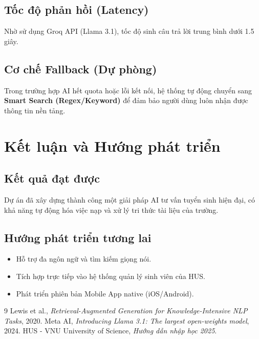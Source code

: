 \documentclass[12pt,a4paper]{report}
\begin{document}
\section{Tốc độ phản hồi (Latency)}
Nhờ sử dụng Groq API (Llama 3.1), tốc độ sinh câu trả lời trung bình dưới 1.5 giây.

\section{Cơ chế Fallback (Dự phòng)}
Trong trường hợp AI hết quota hoặc lỗi kết nối, hệ thống tự động chuyển sang \textbf{Smart Search (Regex/Keyword)} để đảm bảo người dùng luôn nhận được thông tin nền tảng.

\chapter{Kết luận và Hướng phát triển}
\section{Kết quả đạt được}
Dự án đã xây dựng thành công một giải pháp AI tư vấn tuyển sinh hiện đại, có khả năng tự động hóa việc nạp và xử lý tri thức tài liệu của trường.

\section{Hướng phát triển tương lai}
\begin{itemize}
    \item Hỗ trợ đa ngôn ngữ và tìm kiếm giọng nói.
    \item Tích hợp trực tiếp vào hệ thống quản lý sinh viên của HUS.
    \item Phát triển phiên bản Mobile App native (iOS/Android).
\end{itemize}

\begin{thebibliography}{9}
 Lewis et al., \textit{Retrieval-Augmented Generation for Knowledge-Intensive NLP Tasks}, 2020.
 Meta AI, \textit{Introducing Llama 3.1: The largest open-weights model}, 2024.
 HUS - VNU University of Science, \textit{Hướng dẫn nhập học 2025}.
\end{thebibliography}
\end{document}
